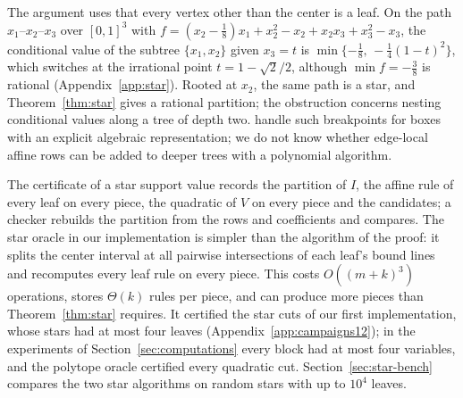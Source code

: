 \begin{remark}\label{rem:trees}
The argument uses that every vertex other than the center is a leaf. On the
path $x_1$--$x_2$--$x_3$ over $[0,1]^3$ with
$f=(x_2-\tfrac18)x_1+x_2^2-x_2+x_2x_3+x_3^2-x_3$, the conditional value of the
subtree $\{x_1,x_2\}$ given $x_3=t$ is
$\min\{-\tfrac18,\,-\tfrac14(1-t)^2\}$, which switches at the irrational point
$t=1-\sqrt2/2$, although $\min f=-\tfrac38$ is rational
(Appendix~\ref{app:star}). Rooted at $x_2$, the same path is a star, and
Theorem~\ref{thm:star} gives a rational partition; the obstruction concerns
nesting conditional values along a tree of depth two.
\citeauthor{DelPiaKhajavirad2026} handle such breakpoints for boxes with an
explicit algebraic representation; we do not know whether edge-local affine
rows can be added to deeper trees with a polynomial algorithm.
\end{remark}

The certificate of a star support value records the partition of $I$, the
affine rule of every leaf on every piece, the quadratic of $V$ on every piece
and the candidates; a checker rebuilds the partition from the rows and
coefficients and compares. The star oracle in our implementation is simpler
than the algorithm of the proof: it splits the center interval at all
pairwise intersections of each leaf's bound lines and recomputes every leaf
rule on every piece. This costs $O((m+k)^3)$ operations, stores $\Theta(k)$
rules per piece, and can produce more pieces than Theorem~\ref{thm:star}
requires. It certified the star cuts of our first implementation, whose
stars had at most four leaves (Appendix~\ref{app:campaigns12}); in the
experiments of Section~\ref{sec:computations} every block had at most four
variables, and the polytope oracle certified every quadratic cut.
Section~\ref{sec:star-bench} compares the two star algorithms on random
stars with up to $10^4$ leaves.
